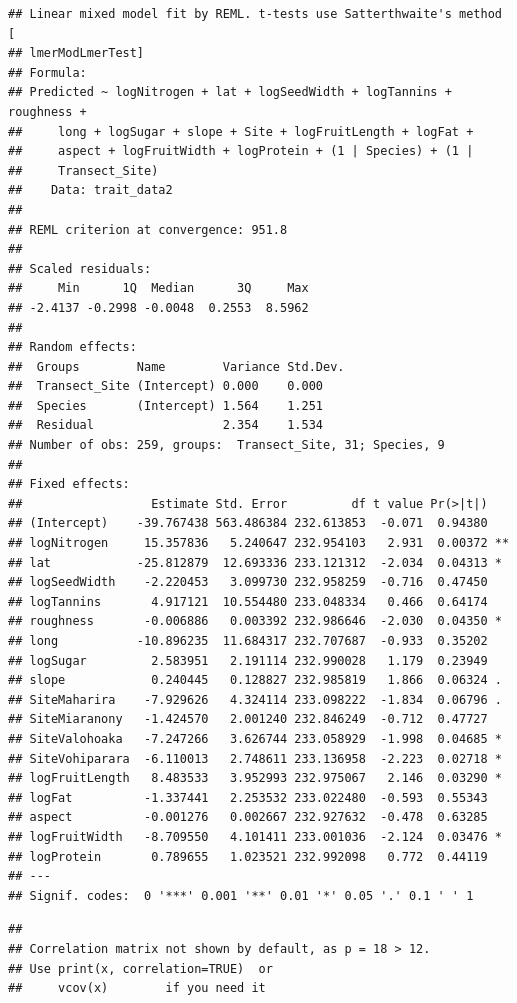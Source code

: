\documentclass[
  12pt,
]{article}
\begin{document}
\begin{verbatim}
## Linear mixed model fit by REML. t-tests use Satterthwaite's method [
## lmerModLmerTest]
## Formula: 
## Predicted ~ logNitrogen + lat + logSeedWidth + logTannins + roughness +  
##     long + logSugar + slope + Site + logFruitLength + logFat +  
##     aspect + logFruitWidth + logProtein + (1 | Species) + (1 |  
##     Transect_Site)
##    Data: trait_data2
## 
## REML criterion at convergence: 951.8
## 
## Scaled residuals: 
##     Min      1Q  Median      3Q     Max 
## -2.4137 -0.2998 -0.0048  0.2553  8.5962 
## 
## Random effects:
##  Groups        Name        Variance Std.Dev.
##  Transect_Site (Intercept) 0.000    0.000   
##  Species       (Intercept) 1.564    1.251   
##  Residual                  2.354    1.534   
## Number of obs: 259, groups:  Transect_Site, 31; Species, 9
## 
## Fixed effects:
##                  Estimate Std. Error         df t value Pr(>|t|)   
## (Intercept)    -39.767438 563.486384 232.613853  -0.071  0.94380   
## logNitrogen     15.357836   5.240647 232.954103   2.931  0.00372 **
## lat            -25.812879  12.693336 233.121312  -2.034  0.04313 * 
## logSeedWidth    -2.220453   3.099730 232.958259  -0.716  0.47450   
## logTannins       4.917121  10.554480 233.048334   0.466  0.64174   
## roughness       -0.006886   0.003392 232.986646  -2.030  0.04350 * 
## long           -10.896235  11.684317 232.707687  -0.933  0.35202   
## logSugar         2.583951   2.191114 232.990028   1.179  0.23949   
## slope            0.240445   0.128827 232.985819   1.866  0.06324 . 
## SiteMaharira    -7.929626   4.324114 233.098222  -1.834  0.06796 . 
## SiteMiaranony   -1.424570   2.001240 232.846249  -0.712  0.47727   
## SiteValohoaka   -7.247266   3.626744 233.058929  -1.998  0.04685 * 
## SiteVohiparara  -6.110013   2.748611 233.136958  -2.223  0.02718 * 
## logFruitLength   8.483533   3.952993 232.975067   2.146  0.03290 * 
## logFat          -1.337441   2.253532 233.022480  -0.593  0.55343   
## aspect          -0.001276   0.002667 232.927632  -0.478  0.63285   
## logFruitWidth   -8.709550   4.101411 233.001036  -2.124  0.03476 * 
## logProtein       0.789655   1.023521 232.992098   0.772  0.44119   
## ---
## Signif. codes:  0 '***' 0.001 '**' 0.01 '*' 0.05 '.' 0.1 ' ' 1
\end{verbatim}

\begin{verbatim}
## 
## Correlation matrix not shown by default, as p = 18 > 12.
## Use print(x, correlation=TRUE)  or
##     vcov(x)        if you need it
\end{verbatim}
\end{document}
